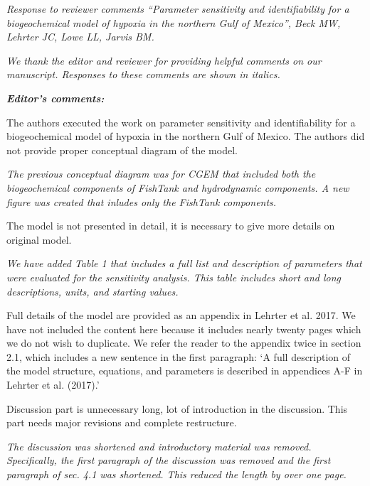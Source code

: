 \documentclass[letterpaper,12pt]{article}\usepackage[]{graphicx}\usepackage[]{color}
\newcommand{\Bigtxt}[1]{\textbf{\textit{#1}}}
\begin{document}
\raggedright


{\it Response to reviewer comments ``Parameter sensitivity and identifiability for a biogeochemical model of hypoxia in the northern Gulf of Mexico'', Beck MW, Lehrter JC, Lowe LL, Jarvis BM.}

{\it We thank the editor and reviewer for providing helpful comments on our manuscript.  Responses to these comments are shown in italics.}

\Bigtxt{Editor's comments:}

The authors executed the work on parameter sensitivity and identifiability for a biogeochemical model of hypoxia in the northern Gulf of Mexico. The authors did not provide proper conceptual diagram of the model.  

{\it The previous conceptual diagram was for CGEM that included both the biogeochemical components of FishTank and hydrodynamic components.  A new figure was created that inludes only the FishTank components.  }

The model is not presented in detail, it is necessary to give more details on original model. 

{\it We have added Table 1 that includes a full list and description of parameters that were evaluated for the sensitivity analysis. This table includes short and long descriptions, units, and starting values.  

Full details of the model are provided as an appendix in Lehrter et al. 2017.  We have not included the content here because it includes nearly twenty pages which we do not wish to duplicate.  We refer the reader to the appendix twice in section 2.1, which includes a new sentence in the first paragraph: `A full description of the model structure, equations, and parameters is described in appendices A-F in Lehrter et al. (2017).'  
}

Discussion part is unnecessary long, lot of introduction in the discussion. This part needs major revisions and complete restructure. 

{\it The discussion was shortened and introductory material was removed.  Specifically, the first paragraph of the discussion was removed and the first paragraph of sec. 4.1 was shortened.  This reduced the length by over one page.}
\end{document}
